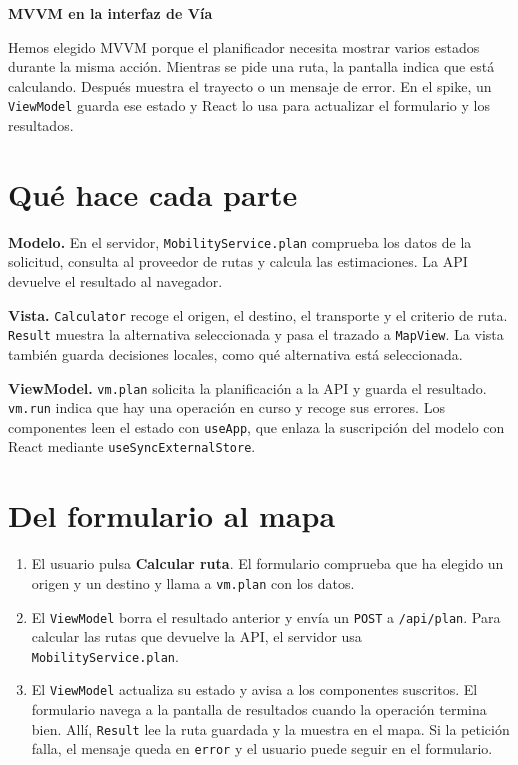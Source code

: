 \documentclass[10pt,a4paper]{article}
\begin{document}
\setcounter{page}{13}
{\LARGE\bfseries MVVM en la interfaz de Vía}\par

Hemos elegido MVVM porque el planificador necesita mostrar varios estados durante la misma acción. Mientras se pide una ruta, la pantalla indica que está calculando. Después muestra el trayecto o un mensaje de error. En el spike, un \texttt{ViewModel} guarda ese estado y React lo usa para actualizar el formulario y los resultados.

\section*{Qué hace cada parte}

\textbf{Modelo.} En el servidor, \texttt{MobilityService.plan} comprueba los datos de la solicitud, consulta al proveedor de rutas y calcula las estimaciones. La API devuelve el resultado al navegador.

\textbf{Vista.} \texttt{Calculator} recoge el origen, el destino, el transporte y el criterio de ruta. \texttt{Result} muestra la alternativa seleccionada y pasa el trazado a \texttt{MapView}. La vista también guarda decisiones locales, como qué alternativa está seleccionada.

\textbf{ViewModel.} \texttt{vm.plan} solicita la planificación a la API y guarda el resultado. \texttt{vm.run} indica que hay una operación en curso y recoge sus errores. Los componentes leen el estado con \texttt{useApp}, que enlaza la suscripción del modelo con React mediante \texttt{useSyncExternalStore}.

\section*{Del formulario al mapa}

\begin{enumerate}
    \item El usuario pulsa \textbf{Calcular ruta}. El formulario comprueba que ha elegido un origen y un destino y llama a \texttt{vm.plan} con los datos.
    \item El \texttt{ViewModel} borra el resultado anterior y envía un \texttt{POST} a \texttt{/api/plan}. Para calcular las rutas que devuelve la API, el servidor usa \texttt{MobilityService.plan}.
    \item El \texttt{ViewModel} actualiza su estado y avisa a los componentes suscritos. El formulario navega a la pantalla de resultados cuando la operación termina bien. Allí, \texttt{Result} lee la ruta guardada y la muestra en el mapa. Si la petición falla, el mensaje queda en \texttt{error} y el usuario puede seguir en el formulario.
\end{enumerate}
\end{document}
